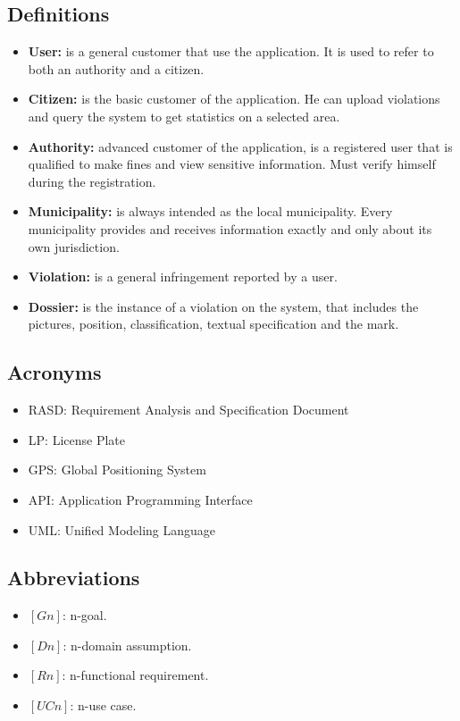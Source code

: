 \documentclass[../RASD.tex]{subfiles}
\begin{document}
    \subsection{Definitions}\label{subsec:definitions}
    \begin{itemize}
        \item \textbf{User:} is a general customer that use the application. It is used to refer to both an authority and a citizen.
        \item \textbf{Citizen:} is the basic customer of the application. He can upload violations and query the system to get statistics on a selected area.
        \item \textbf{Authority:} advanced customer of the application, is a registered user that is qualified to make fines and view sensitive information. Must verify himself during the registration.
        \item \textbf{Municipality:} is always intended as the local municipality. Every municipality provides and receives information exactly and only about its own jurisdiction.
        \item \textbf{Violation:} is a general infringement reported by a user.
        \item  \textbf{Dossier:} is the instance of a violation on the system, that includes the pictures, position, classification, textual specification and the mark.
    \end{itemize}

    \subsection{Acronyms}\label{subsec:acronyms}
    \begin{itemize}
        \item RASD: Requirement Analysis and Specification Document
        \item LP: License Plate
        \item GPS: Global Positioning System
        \item API: Application Programming Interface
        \item UML: Unified Modeling Language
    \end{itemize}

    \subsection{Abbreviations}\label{subsec:abbreviations}
    \begin{itemize}
        \item $[Gn]$: n-goal.
        \item $[Dn]$: n-domain assumption.
        \item $[Rn]$: n-functional requirement.
        \item $[UCn]$: n-use case.
    \end{itemize}
    \newpage
\end{document}
